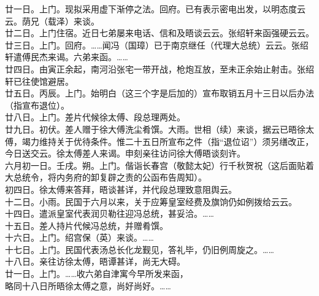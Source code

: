 廿一日。上门。现拟采用虚下渐停之法。回府。已有表示密电出发，以明态度云云。荫兄（载泽）来谈。\\

廿二日。上门住宿。近日七弟屡来电话、信和及晤谈云云。张绍轩来函强硬云云。\\

廿三日。上门。回府。……闻冯（国璋）已于南京继任（代理大总统）云云。张绍轩遣傅民杰来谒。六弟来函。……\\

廿四日。由寅正余起，南河沿张宅一带开战，枪炮互放，至未正余始止射击。张绍轩已往使馆避居。\\

廿五日。丙辰。上门。始明白（这三个字是后加的）宣布取销五月十三日以后办法（指宣布退位）。\\

廿八日。上门。差片代候徐太傅、段总理两处。\\

廿九日。初伏。差人赠于徐大傅洗尘肴馔。大雨。世相（续）来谈，据云已晤徐太傅，竭力维持关于优待条件。惟二十五日所宣布之件（指“退位诏”）须另缮改正，今日送交云。徐太傅差人来谒。申刻亲往访问徐大傅晤谈刻许。\\

六月初一日。壬戌。朔。上门。偕诣长春宫（敬懿太妃）行千秋贺祝（这后面贴着大总统令，将内务府的卸复辟之责的公函布告周知）。\\

初四日。徐太傅来答拜，晤谈甚详，并代段总理致意阻舆云。\\

十二日。小雨。民国于六月以来，关于应筹皇室经费及旗饷仍如例拨给云云。\\

十四日。遣派皇室代表润贝勒往迎冯总统，甚妥洽。……\\

十五日。差人持片代候冯总统，并赠肴馔。\\

十六日。上门。绍宫保（英）来谈。……\\

十七日。上门。民国代表汤总长化龙觐见，答礼毕，仍旧例周旋之。……\\

十八日。亲往访徐太傅，晤谭甚详，尚无大碍。\\

廿一日。上门。……收六弟自津寓今早所发来函，\\

略同十八日所晤徐太傅之意，尚好尚好。……\\

